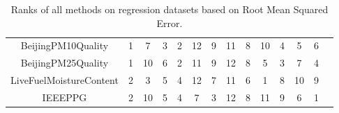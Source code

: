 \documentclass{article} \usepackage{iclr2021_conference,times}
\begin{document}
\begin{table}
\begin{adjustbox}{width=1.2\textwidth,center=\textwidth}
\begin{tabular}{|c|c|c|c|c|c|c|c|c|c|c|c|c|c|}
BeijingPM10Quality      & 1                                  & 7                    & 3                                                                         & 2                    & 12                                                                  & 9                                                                   & 11                                                                    & 8                                                                     & 10                   & 4                    & 5                    & 6          \\
BeijingPM25Quality      & 1                                  & 10                   & 6                                                                         & 2                    & 11                                                                  & 9                                                                   & 12                                                                    & 8                                                                     & 5                    & 3                    & 7                    & 4           \\
LiveFuelMoistureContent & 2                                  & 3                    & 5                                                                         & 4                    & 12                                                                  & 7                                                                   & 11                                                                    & 6                                                                     & 1                    & 8                    & 10                   & 9   \\
IEEEPPG                 & 2                                  & 10                   & 5                                                                         & 4                    & 7                                                                   & 3                                                                   & 12                                                                    & 8                                                                     & 11                   & 9                    & 6                    & 1     \\
\hline
\end{tabular}
\end{adjustbox}
\caption{Ranks of all methods on regression datasets based on Root Mean Squared Error.}

\end{table}
\end{document}
